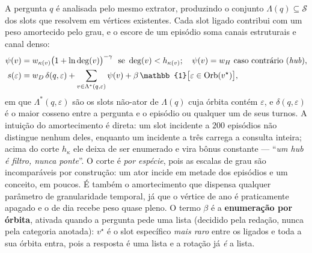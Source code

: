 A pergunta $q$ é analisada pelo mesmo extrator, produzindo o conjunto
$\Lambda(q)\subseteq\mathcal{S}$ dos slots que resolvem em vértices existentes.
Cada slot ligado contribui com um peso amortecido pelo grau, e o escore de um
episódio soma canais estruturais e canal denso:
\begin{equation}
\begin{aligned}
\psi(v)&=w_{\kappa(v)}\bigl(1+\ln \deg(v)\bigr)^{-\gamma}\ \ \text{se}\ \deg(v)<h_{\kappa(v)};\quad
\psi(v)=w_{H}\ \text{caso contrário (\emph{hub})},\\
s(\varepsilon)&=w_{D}\,\delta(q,\varepsilon)+\sum_{v\in\Lambda^{*}(q,\varepsilon)}\psi(v)
+\beta\,\mathbb{1}\bigl[\varepsilon\in\mathrm{Orb}(v^{\star})\bigr],
\end{aligned}
\label{eq:psi}
\end{equation}
em que $\Lambda^{*}(q,\varepsilon)$ são os slots não-\textsf{ator} de $\Lambda(q)$ cuja
órbita contém $\varepsilon$, e $\delta(q,\varepsilon)$ é o maior cosseno entre a pergunta
e o episódio ou qualquer um de seus turnos. A intuição do amortecimento é direta: um slot incidente a $200$
episódios não distingue nenhum deles, enquanto um incidente a três carrega a
consulta inteira; acima do corte $h_\kappa$ ele deixa de ser enumerado e vira
bônus constante --- ``\emph{um hub é filtro, nunca ponte}''. O corte é \emph{por
espécie}, pois as escalas de grau são incomparáveis por construção: um ator incide
em metade dos episódios e um conceito, em poucos. É também o amortecimento que
dispensa qualquer parâmetro de granularidade temporal, já que o vértice de ano é
praticamente apagado e o de dia recebe peso quase pleno. O termo $\beta$ é a
\textbf{enumeração por órbita}, ativada quando a pergunta pede uma lista (decidido
pela redação, nunca pela categoria anotada): $v^{\star}$ é o slot específico
\emph{mais raro} entre os ligados e toda a sua órbita entra, pois a resposta é uma
lista e a rotação já \emph{é} a lista.

